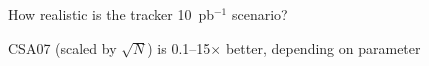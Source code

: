 \documentclass[compress]{beamer}
\begin{document}
\begin{frame}
\vspace{0.25 cm}
How realistic is the tracker 10~pb$^{-1}$ scenario?

CSA07 (scaled by $\sqrt{N}$) is 0.1--15$\times$ better, depending on parameter
\end{frame}



\end{document}
